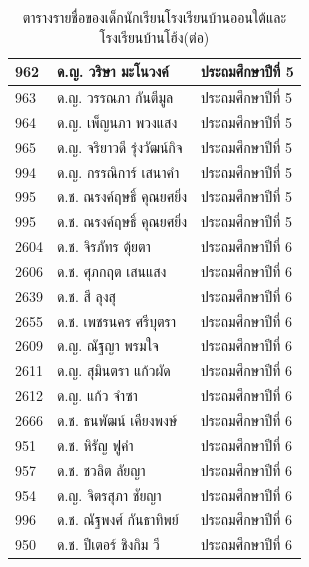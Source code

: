 \begin{table}[h]
\begin{center}
\begin{tabular}{ |p{3cm}|p{4cm}|p{3cm}| }
            962 & ด.ญ. วริษา มะโนวงค์ & ประถมศึกษาปีที่ 5\\
            \hline
            963 & ด.ญ. วรรณภา กันตีมูล & ประถมศึกษาปีที่ 5\\
            \hline
            964 & ด.ญ. เพ็ญนภา พวงแสง & ประถมศึกษาปีที่ 5\\
            \hline
            965 & ด.ญ. จริยาวดี รุ่งวัฒน์กิจ & ประถมศึกษาปีที่ 5\\
            \hline
            994 & ด.ญ. กรรณิการ์ เสนาคำ & ประถมศึกษาปีที่ 5\\
            \hline
            995 & ด.ช. ณรงค์ฤษธิ์ คุณยศยิ่ง & ประถมศึกษาปีที่ 5\\
            \hline
            995 & ด.ช. ณรงค์ฤษธิ์ คุณยศยิ่ง & ประถมศึกษาปีที่ 5\\
            \hline
            2604 & ด.ช. จิรภัทร ตุ้ยตา & ประถมศึกษาปีที่ 6\\
            \hline
            2606 & ด.ช. ศุภกฤต เสนแสง & ประถมศึกษาปีที่ 6\\
            \hline
            2639 & ด.ช. สี ลุงสุ & ประถมศึกษาปีที่ 6\\
            \hline
            2655 & ด.ช. เพชรนคร ศรีบุตรา & ประถมศึกษาปีที่ 6\\
            \hline
            2609 & ด.ญ. ณัฐญา พรมใจ & ประถมศึกษาปีที่ 6\\
            \hline
            2611 & ด.ญ. สุมินตรา แก้วผัด & ประถมศึกษาปีที่ 6\\
            \hline
            2612 & ด.ญ. แก้ว จำซา & ประถมศึกษาปีที่ 6\\
            \hline
            2666 & ด.ช. ธนพัฒน์ เคียงพงษ์ & ประถมศึกษาปีที่ 6\\
            \hline
            951 & ด.ช. หิรัญ ฟูคำ & ประถมศึกษาปีที่ 6\\
            \hline
            957 & ด.ช. ชวลิต ลัยญา & ประถมศึกษาปีที่ 6\\
            \hline
            954 & ด.ญ. จิตรสุภา ชัยญา & ประถมศึกษาปีที่ 6\\
            \hline
            996 & ด.ช. ณัฐพงศ์ กันธาทิพย์ & ประถมศึกษาปีที่ 6\\
            \hline
            950 & ด.ช. ปีเตอร์ ชิงกิม วี & ประถมศึกษาปีที่ 6\\
            \hline
        \end{tabular}
    \end{center}
    \caption[ตารางรายชื่อของเด็กนักเรียนโรงเรียนบ้านออนใต้และโรงเรียนบ้านโฮ้ง(ต่อ)]{ตารางรายชื่อของเด็กนักเรียนโรงเรียนบ้านออนใต้และโรงเรียนบ้านโฮ้ง(ต่อ)}
    \label{studentstablecontinue}
\end{table}


